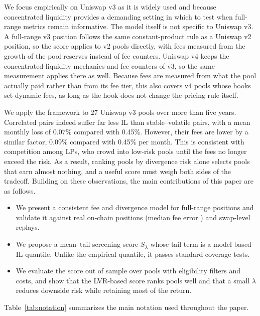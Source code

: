 \documentclass[10pt,conference,compsocconf]{IEEEtran}
\begin{document}
We focus empirically on Uniswap v3 as it is widely used and because concentrated liquidity provides a demanding setting in which to test when full-range metrics remain informative. The model itself is not specific to Uniswap v3. A full-range v3 position follows the same constant-product rule as a Uniswap v2 position, so the score applies to v2 pools directly, with fees measured from the growth of the pool reserves instead of fee counters. Uniswap v4 keeps the concentrated-liquidity mechanics and fee counters of v3, so the same measurement applies there as well. Because fees are measured from what the pool actually paid rather than from its fee tier, this also covers v4 pools whose hooks set dynamic fees, as long as the hook does not change the pricing rule itself.

We apply the framework to 27 Uniswap v3 pools over more than five years. Correlated pairs indeed suffer far less IL than stable--volatile pairs, with a mean monthly loss of 0.07\% compared with 0.45\%. However, their fees are lower by a similar factor, 0.09\% compared with 0.45\% per month. This is consistent with competition among LPs, who crowd into low-risk pools until the fees no longer exceed the risk. As a result, ranking pools by divergence risk alone selects pools that earn almost nothing, and a useful score must weigh both sides of the tradeoff. Building on these observations, the main contributions of this paper are as follows.
\begin{itemize}[leftmargin=*,itemsep=1pt,topsep=2pt]
    \item We present a consistent fee and divergence model for full-range positions and validate it against \FeePositions{} real on-chain positions (median fee error \FeeMedianErr{}) and swap-level replays.
    \item We propose a mean--tail screening score $S_\lambda$ whose tail term is a model-based IL quantile. Unlike the empirical quantile, it passes standard coverage tests.
    \item We evaluate the score out of sample over \NPools{} pools with eligibility filters and costs, and show that the LVR-based score ranks pools well and that a small $\lambda$ reduces downside risk while retaining most of the return.
\end{itemize}
Table~\ref{tab:notation} summarizes the main notation used throughout the paper.
\end{document}

